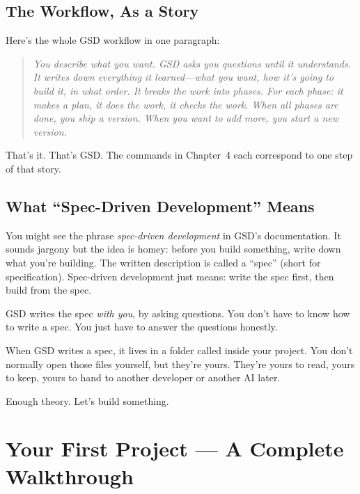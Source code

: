 \documentclass[11pt,letterpaper,openany]{book}
\begin{document}
\section{The Workflow, As a Story}

Here's the whole GSD workflow in one paragraph:

\begin{quote}
\emph{You describe what you want. GSD asks you questions until it
understands. It writes down everything it learned---what you want, how
it's going to build it, in what order. It breaks the work into phases.
For each phase: it makes a plan, it does the work, it checks the work.
When all phases are done, you ship a version. When you want to add
more, you start a new version.}
\end{quote}

That's it. That's GSD. The commands in Chapter~4 each correspond to
one step of that story.

\section{What ``Spec-Driven Development'' Means}

You might see the phrase \emph{spec-driven development} in GSD's
documentation. It sounds jargony but the idea is homey: before you build
something, write down what you're building. The written description is
called a ``spec'' (short for specification). Spec-driven development just
means: write the spec first, then build from the spec.

GSD writes the spec \emph{with you}, by asking questions. You don't have
to know how to write a spec. You just have to answer the questions
honestly.

\begin{gsdnote}
When GSD writes a spec, it lives in a folder called 
inside your project. You don't normally open those files yourself, but
they're yours. They're yours to read, yours to keep, yours to hand to
another developer or another AI later.
\end{gsdnote}

\bigskip
\noindent Enough theory. Let's build something.

\chapter{Your First Project --- A Complete Walkthrough}
\end{document}
